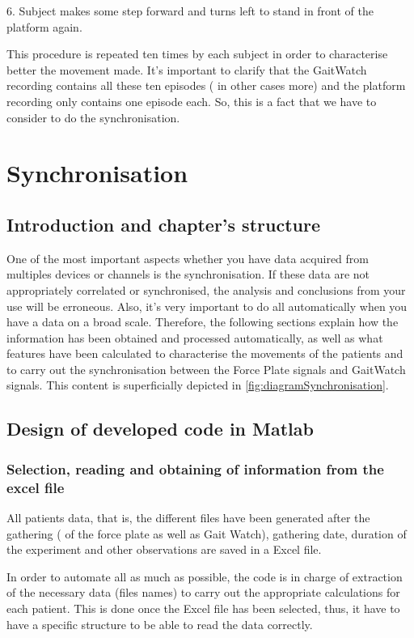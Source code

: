 6.	Subject makes some step  forward and turns left to stand in front of the platform again.

This procedure is repeated ten times by each subject in order to characterise better the movement made.
It’s important to clarify that the GaitWatch recording contains all these ten episodes ( in other cases more) and the platform recording only contains one episode each. So, this is a fact that we have to consider to do the synchronisation.

\section{Synchronisation}

\subsection{Introduction and chapter's structure}
One of the most important aspects whether you have data acquired from multiples devices or channels is the synchronisation. If these data are not appropriately correlated or synchronised, the analysis and conclusions from your use will be erroneous. Also, it’s very important to do all automatically when you have a data on a broad scale.
Therefore, the following sections explain how the information has been obtained and processed automatically, as well as what features have been calculated to characterise the movements of the patients and to carry out the synchronisation between the Force Plate signals and GaitWatch signals. This content is superficially depicted in \ref{fig:diagramSynchronisation}.

\subsection{Design of developed code  in Matlab}
\subsubsection{Selection, reading and obtaining of information from the excel file}
All patients data, that is, the different files have been generated after the gathering (  of the force plate as well as Gait Watch), gathering date, duration of the experiment and other observations are saved in a Excel file. 

In order to automate all as much as possible, the code is in charge of extraction of the necessary data (files names) to carry out the appropriate calculations for each patient. This is done once the Excel file has been selected, thus, it have to have a specific structure to be able to read the data correctly.

